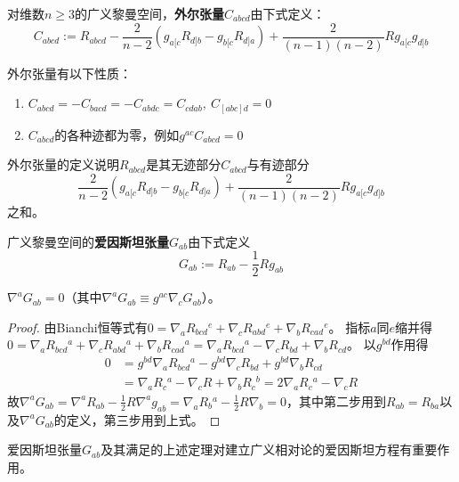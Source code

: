 \begin{definition}
对维数$n \geq 3$的广义黎曼空间，\textbf{外尔张量}$C_{abcd}$由下式定义：
$$C_{abcd} := R_{abcd} - \frac{2}{n - 2}(g_{a[c}R_{d]b} - g_{b[c}R_{d]a}) + \frac{2}{(n - 1)(n - 2)}Rg_{a[c}g_{d]b}$$
\end{definition}

\begin{theorem}
外尔张量有以下性质：
\begin{enumerate}[（1）]
\item $C_{abcd} = -C_{bacd} = -C_{abdc} = C_{cdab}, ~ C_{[abc]d} = 0$
\item $C_{abcd}$的各种迹都为零，例如$g^{ac}C_{abcd} = 0$
\end{enumerate}
\end{theorem}

\begin{note}
外尔张量的定义说明$R_{abcd}$是其无迹部分$C_{abcd}$与有迹部分
$$\frac{2}{n - 2}(g_{a[c}R_{d]b} - g_{b[c}R_{d]a}) + \frac{2}{(n - 1)(n - 2)}Rg_{a[c}g_{d]b}$$
之和。
\end{note}

\begin{definition}
广义黎曼空间的\textbf{爱因斯坦张量}$G_{ab}$由下式定义
$$G_{ab} := R_{ab} - \frac{1}{2}Rg_{ab}$$
\end{definition}

\begin{theorem}
$\nabla^aG_{ab} = 0$（其中$\nabla^aG_{ab} \equiv g^{ac}\nabla_cG_{ab}$）。
\end{theorem}

\begin{proof}
由Bianchi恒等式有$0 = \nabla_aR_{bcd}{}^e + \nabla_cR_{abd}{}^e + \nabla_bR_{cad}{}^e$。
指标$a$同$e$缩并得$0 = \nabla_aR_{bcd}{}^a + \nabla_cR_{abd}{}^a + \nabla_bR_{cad}{}^a = \nabla_aR_{bcd}{}^a - \nabla_cR_{bd} + \nabla_bR_{cd}$。
以$g^{bd}$作用得
$$\begin{aligned}
0 & = g^{bd}\nabla_aR_{bcd}{}^a - g^{bd}\nabla_cR_{bd} + g^{bd}\nabla_bR_{cd} \\
& = \nabla_aR_{c}{}^a - \nabla_cR + \nabla_bR_c{}^b = 2\nabla_aR_c{}^a - \nabla_cR
\end{aligned}$$
故$\nabla^aG_{ab} = \nabla^aR_{ab} - \frac{1}{2}R\nabla^ag_{ab} = \nabla_aR_{b}{}^a - \frac{1}{2}R\nabla_b = 0$，其中第二步用到$R_{ab} = R_{ba}$以及$\nabla^aG_{ab}$的定义，第三步用到上式。
\end{proof}

爱因斯坦张量$G_{ab}$及其满足的上述定理对建立广义相对论的爱因斯坦方程有重要作用。

